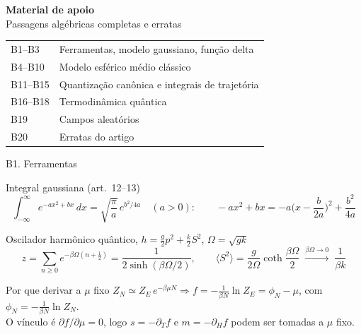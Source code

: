 \documentclass[10pt,aspectratio=169]{beamer}
\newcommand{\eq}[1]{\textcolor{qcdBlue!70!black}{\small(#1)}}
\begin{document}
\appendix
{}

\begin{frame}
  \centering\Large\textcolor{qcdBlue}{\textbf{Material de apoio}}\\[8pt]
  \normalsize Passagens algébricas completas e erratas\\[14pt]
  \small
  \begin{tabular}{ll}
    B1--B3 & Ferramentas, modelo gaussiano, função delta\\
    B4--B10 & Modelo esférico médio clássico\\
    B11--B15 & Quantização canônica e integrais de trajetória\\
    B16--B18 & Termodinâmica quântica\\
    B19 & Campos aleatórios\\
    B20 & Erratas do artigo
  \end{tabular}
\end{frame}

\begin{frame}{B1. Ferramentas}
  \small
  \begin{block}{Integral gaussiana \eq{art.~12--13}}
    \[\int_{-\infty}^{\infty}e^{-ax^2+bx}\,dx=\sqrt{\frac\pi a}\,e^{b^2/4a}\quad(a>0):\qquad
      -ax^2+bx=-a\Big(x-\frac b{2a}\Big)^2+\frac{b^2}{4a}\]
  \end{block}
  \begin{block}{Oscilador harmônico quântico, $h=\frac g2p^2+\frac k2S^2$, $\Omega=\sqrt{gk}$}
    \[z=\sum_{n\ge0}e^{-\beta\Omega(n+\frac12)}=\frac{1}{2\sinh(\beta\Omega/2)},\qquad
      \langle S^2\rangle=\frac{g}{2\Omega}\coth\frac{\beta\Omega}2\;\xrightarrow{\beta\Omega\to0}\;\frac1{\beta k}\]
  \end{block}
  \begin{block}{Por que derivar a $\mu$ fixo}
    $Z_N\simeq Z_E\,e^{-\beta\mu N}\Rightarrow f=-\frac1{\beta N}\ln Z_E=\phi_N-\mu$, com $\phi_N=-\frac1{\beta N}\ln Z_N$.\\
    O vínculo é $\partial f/\partial\mu=0$, logo $s=-\partial_Tf$ e $m=-\partial_Hf$ podem ser tomadas a $\mu$ fixo.
  \end{block}
\end{frame}
\end{document}
